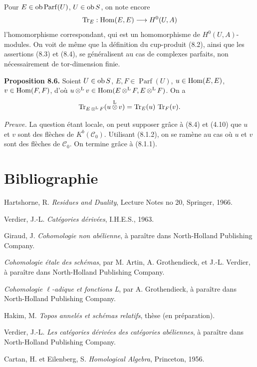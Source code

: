 \documentclass[11pt]{article}
\newcommand{\Parf}{\operatorname{Parf}}
\begin{document}
Pour \(E\in\Ob\Parf(U)\), \(U\in\operatorname{ob} S\), on note encore
\[
  \operatorname{Tr}_E:\operatorname{Hom}(E,E)\longrightarrow H^0(U,A)
\]
l'homomorphisme correspondant, qui est un homomorphisme de \(H^0(U,A)\)-modules. On voit de même que la définition du cup-produit (8.2), ainsi que les assertions (8.3) et (8.4), se généralisent au cas de complexes parfaits, non nécessairement de tor-dimension finie.

\textbf{Proposition 8.6.} Soient \(U\in\operatorname{ob} S\), \(E,F\in\Parf(U)\), \(u\in\operatorname{Hom}(E,E)\), \(v\in\operatorname{Hom}(F,F)\), d'où \(u\mathop{\otimes}^{\mathrm L} v\in\operatorname{Hom}(E\mathop{\otimes}^{\mathrm L} F,E\mathop{\otimes}^{\mathrm L} F)\). On a
\[
  \operatorname{Tr}_{E\mathop{\otimes}^{\mathrm L} F}(u\mathop{\otimes}^{\mathrm L} v)=\operatorname{Tr}_E(u)\,\operatorname{Tr}_F(v).
\]

\emph{Preuve.} La question étant locale, on peut supposer grâce à (8.4) et (4.10) que \(u\) et \(v\) sont des flèches de \(K^b(\mathcal C_0)\). Utilisant (8.1.2), on se ramène au cas où \(u\) et \(v\) sont des flèches de \(\mathcal C_0\). On termine grâce à (8.1.1).

\section*{Bibliographie}
\begin{description}[leftmargin=2.5cm,style=nextline]
\item[{[H]}] Hartshorne, R. \emph{Residues and Duality}, Lecture Notes no 20, Springer, 1966.
\item[{[V]}] Verdier, J.-L. \emph{Catégories dérivées}, I.H.E.S., 1963.
\item[{[G]}] Giraud, J. \emph{Cohomologie non abélienne}, à paraître dans North-Holland Publishing Company.
\item[{SGA 4}] \emph{Cohomologie étale des schémas}, par M. Artin, A. Grothendieck, et J.-L. Verdier, à paraître dans North-Holland Publishing Company.
\item[{SGA 5}] \emph{Cohomologie \(\ell\)-adique et fonctions L}, par A. Grothendieck, à paraître dans North-Holland Publishing Company.
\item[{[1]}] Hakim, M. \emph{Topos annelés et schémas relatifs}, thèse (en préparation).
\item[{[2]}] Verdier, J.-L. \emph{Les catégories dérivées des catégories abéliennes}, à paraître dans North-Holland Publishing Company.
\item[{[MUL]}] Cartan, H. et Eilenberg, S. \emph{Homological Algebra}, Princeton, 1956.
\end{description}
\end{document}
